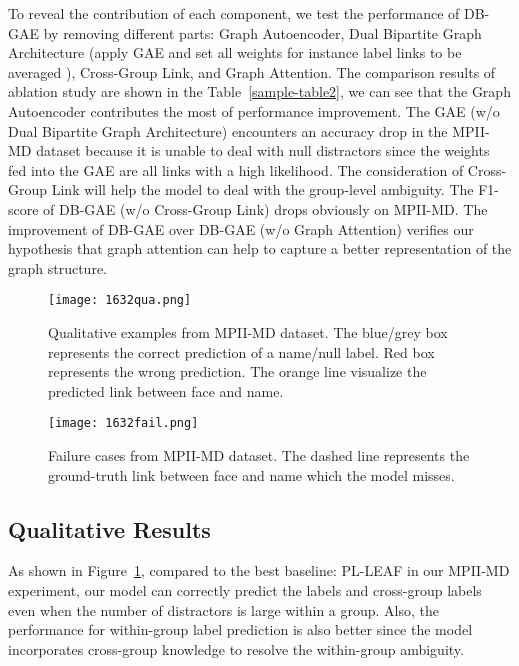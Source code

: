 \documentclass[letterpaper]{article} \usepackage{aaai20}  \usepackage{times}  \usepackage{helvet} \usepackage{courier}  \usepackage[hyphens]{url}  \usepackage{graphicx} \urlstyle{rm} \def\UrlFont{\rm}  \frenchspacing  \setlength{\pdfpagewidth}{8.5in}  \setlength{\pdfpageheight}{11in}  \frenchspacing
\begin{document}
To reveal the contribution of each component, we test the performance of DB-GAE by removing different parts: Graph Autoencoder, Dual Bipartite Graph Architecture (apply GAE and set all weights for instance label links to be averaged \cite{hullermeier2006learning,zhang2015solving}), Cross-Group Link, and Graph Attention.
The comparison results of ablation study are shown in the Table~\ref{sample-table2}, we can see that the Graph Autoencoder contributes the most of performance improvement. The GAE (w/o Dual Bipartite Graph Architecture) encounters an accuracy drop in the MPII-MD dataset because it is unable to deal with null distractors since the weights fed into the GAE are all links with a high likelihood. 
The consideration of Cross-Group Link will help the model to deal with the group-level ambiguity. The F1-score of DB-GAE (w/o Cross-Group Link) drops obviously on MPII-MD. The improvement of DB-GAE over DB-GAE (w/o Graph Attention) verifies our hypothesis that graph attention can help to capture a better representation of the graph structure.




\begin{figure}[!th]
  \texttt{[image: 1632qua.png]}
  \centering
\caption{Qualitative examples from MPII-MD dataset. The blue/grey box represents the correct prediction of a name/null label. Red box represents the wrong prediction. The orange line visualize the predicted link between face and name.}
  \label{fig:qualitative}
\end{figure}

\begin{figure}[!th]

  \texttt{[image: 1632fail.png]}
  \centering
\caption{Failure cases from MPII-MD dataset. The dashed line represents the ground-truth link between face and name which the model misses.}
  
  \label{fig:fail}
\end{figure}

\subsection{Qualitative Results}
As shown in Figure~\ref{fig:qualitative}, compared to the best baseline: PL-LEAF in our MPII-MD experiment, our model can correctly predict the  labels and cross-group labels even when the number of distractors is large within a group. Also, the performance for within-group label prediction is also better since the model incorporates cross-group knowledge to resolve the within-group ambiguity.
\end{document}
